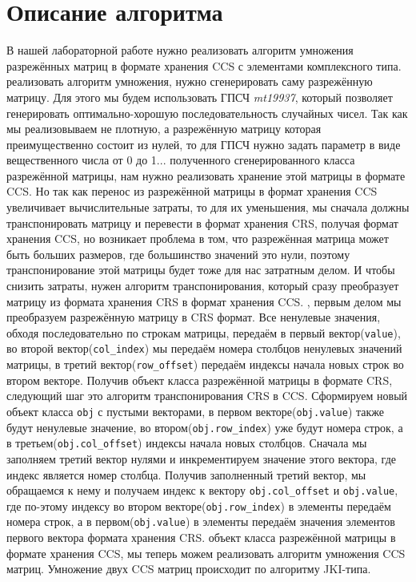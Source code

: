 \documentclass[14pt,a4paper,report]{ncc}
\begin{document}
	
	\section*{Описание алгоритма}
	В нашей лабораторной работе нужно реализовать алгоритм умножения разрежённых матриц в формате хранения CCS с элементами комплексного типа.
	 реализовать алгоритм умножения, нужно сгенерировать саму разрежённую матрицу. Для этого мы будем использовать ГПСЧ \textit{mt19937}, который позволяет генерировать оптимально-хорошую последовательность случайных чисел. Так как мы реализовываем не плотную, а разрежённую матрицу которая преимущественно состоит из нулей, то для ГПСЧ нужно задать параметр в виде вещественного числа от 0 до 1...
	 полученного сгенерированного класса разрежённой матрицы, нам нужно реализовать хранение этой матрицы в формате CCS. Но так как перенос из разрежённой матрицы в формат хранения CCS увеличивает вычислительные затраты, то для их уменьшения, мы сначала должны транспонировать матрицу и перевести в формат хранения CRS, получая формат хранения CCS, но возникает проблема в том, что разрежённая матрица может быть больших размеров, где большинство значений это нули, поэтому транспонирование этой матрицы будет тоже для нас затратным делом. И чтобы снизить затраты, нужен алгоритм транспонирования, который сразу преобразует матрицу из формата хранения CRS в формат хранения CCS.
	, первым делом мы преобразуем разрежённую матрицу в CRS формат. Все ненулевые значения, обходя последовательно по строкам матрицы, передаём в первый вектор(\verb|value|), во второй вектор(\verb|col_index|) мы передаём номера столбцов ненулевых значений матрицы, в третий вектор(\verb|row_offset|) передаём индексы начала новых строк во втором векторе. Получив объект класса разрежённой матрицы в формате CRS, следующий шаг это алгоритм транспонирования CRS в CCS. Сформируем новый объект класса \verb|obj| с пустыми векторами, в первом векторе(\verb|obj.value|) также будут ненулевые значение, во втором(\verb|obj.row_index|) уже будут номера строк, а в третьем(\verb|obj.col_offset|) индексы начала новых столбцов. Сначала мы заполняем третий вектор  нулями и инкрементируем значение этого вектора, где индекс является номер столбца. Получив заполненный третий вектор, мы обращаемся к нему и получаем индекс к вектору \verb|obj.col_offset| и \verb|obj.value|, где по-этому индексу во втором векторе(\verb|obj.row_index|) в элементы передаём номера строк, а в первом(\verb|obj.value|) в элементы передаём значения элементов первого вектора формата хранения CRS.
	 объект класса разрежённой матрицы в формате хранения CCS, мы теперь можем реализовать алгоритм умножения CCS матриц. Умножение двух CCS матриц происходит по алгоритму JKI-типа.
	
\end{document}
